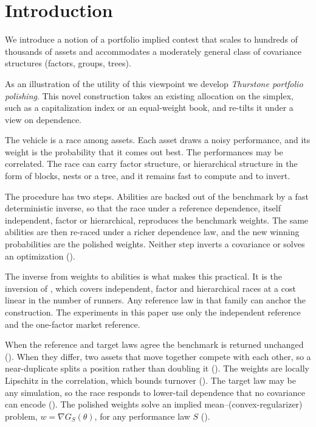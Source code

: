 \section{Introduction}
\label{sec:intro}

We introduce a notion of a portfolio implied contest that scales to hundreds of
thousands of assets and accommodates a moderately general class of covariance
structures (factors, groups, trees).

As an illustration of the utility of this viewpoint we develop \emph{Thurstone
portfolio polishing}.
This novel construction takes an existing allocation on the
simplex, such as a capitalization index or an equal-weight book, and re-tilts it
under a view on dependence.

The vehicle is a race among assets. Each asset
draws a noisy performance, and its weight is the probability that it comes out
best.
The performances may be correlated.
The race can carry factor structure, or
hierarchical structure in the form of blocks, nests or a tree, and it remains fast
to compute and to invert.

The procedure has two steps. Abilities are backed out of the benchmark by a fast
deterministic inverse, so that the race under a reference dependence, itself
independent, factor or hierarchical, reproduces the benchmark weights. The same
abilities are then re-raced under a richer dependence law, and the new winning
probabilities are the polished weights. Neither step inverts a covariance or solves an optimization
().

The inverse from weights to abilities is what makes this practical. It is the
inversion of \textcite{cotton2026inversion}, which covers independent, factor and hierarchical races at a cost
linear in the number of runners. Any reference law in that family can anchor the
construction. The experiments in this paper use only the independent reference and
the one-factor market reference.

When the reference and target laws agree the benchmark is returned unchanged
(). When they differ, two assets that move together compete
with each other, so a near-duplicate splits a position rather than doubling it
(). The weights are locally Lipschitz in the correlation,
which bounds turnover (). The target law may be any simulation, so
the race responds to lower-tail dependence that no covariance can encode
(). The polished weights solve an implied
mean--(convex-regularizer) problem, $w = \nabla G_S(\theta)$, for any performance
law $S$ ().

